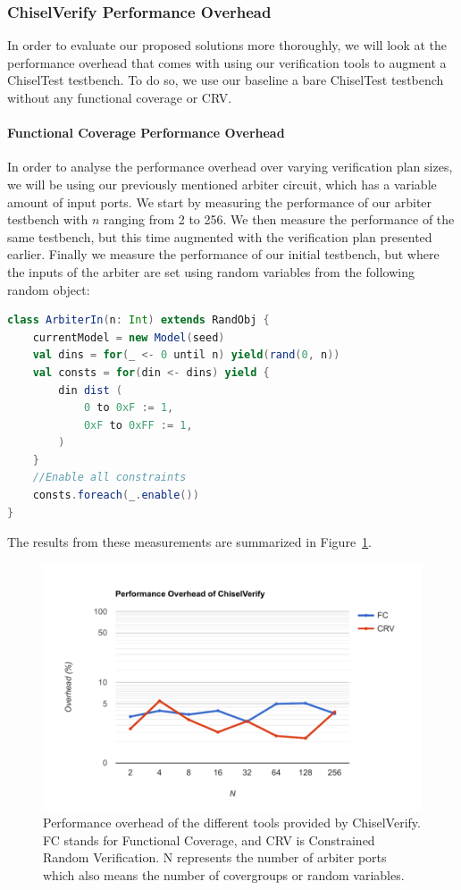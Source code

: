 \documentclass[conference]{IEEEtran}
\begin{document}
\subsubsection{ChiselVerify Performance Overhead}
In order to evaluate our proposed solutions more thoroughly, we will look at the performance overhead that comes with using our verification tools to augment a ChiselTest testbench.
To do so, we use our baseline a bare ChiselTest testbench without any functional coverage or CRV.

\paragraph{Functional Coverage Performance Overhead} In order to analyse the performance overhead over varying verification plan sizes, we will be using our previously mentioned arbiter circuit, which has a variable amount of input ports.
We start by measuring the performance of our arbiter testbench with $n$ ranging from 2 to 256.
We then measure the performance of the same testbench, but this time augmented with the verification plan presented earlier.
Finally we measure the performance of our initial testbench, but where the inputs of the arbiter are set using random variables from the following random object:
\begin{lstlisting}[language=scala]
class ArbiterIn(n: Int) extends RandObj {
    currentModel = new Model(seed)
    val dins = for(_ <- 0 until n) yield(rand(0, n))
    val consts = for(din <- dins) yield {
        din dist (
            0 to 0xF := 1,
            0xF to 0xFF := 1,
        )
    }
    //Enable all constraints
    consts.foreach(_.enable())
}
\end{lstlisting}
The results from these measurements are summarized in Figure~\ref{fig:cvoverhead}.
\begin{figure}[h]
  \centering
  \includegraphics[trim=0.7cm 0.5cm 1cm 1cm, clip, width=.9\linewidth]{cvoverhead.pdf}
  \caption{Performance overhead of the different tools provided by ChiselVerify. FC stands for Functional Coverage, and CRV is Constrained Random Verification. N represents the number of arbiter ports which also means the number of covergroups or random variables.}
  \label{fig:cvoverhead}
\end{figure}
\end{document}

